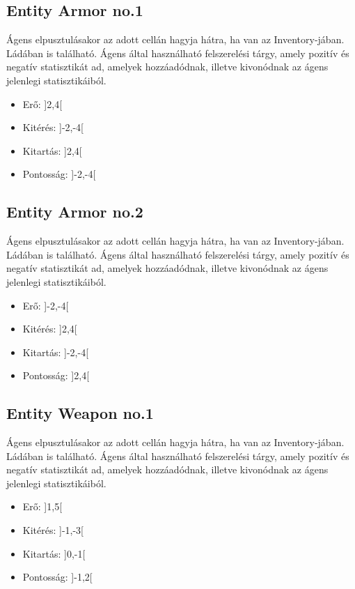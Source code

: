 \subsection{Entity Armor no.1}

Ágens elpusztulásakor az adott cellán hagyja hátra, ha van az Inventory-jában. Ládában is található.
Ágens által használható felszerelési tárgy, amely pozitív és negatív statisztikát ad, amelyek hozzáadódnak, illetve kivonódnak az ágens jelenlegi statisztikáiból.

\begin{itemize}
    \item Erő: ]2,4[
    \item Kitérés: ]-2,-4[
    \item Kitartás: ]2,4[
    \item Pontosság: ]-2,-4[
\end{itemize}

\subsection{Entity Armor no.2}

Ágens elpusztulásakor az adott cellán hagyja hátra, ha van az Inventory-jában. Ládában is található.
Ágens által használható felszerelési tárgy, amely pozitív és negatív statisztikát ad, amelyek hozzáadódnak, illetve kivonódnak az ágens jelenlegi statisztikáiból.

\begin{itemize}
    \item Erő: ]-2,-4[
    \item Kitérés: ]2,4[
    \item Kitartás: ]-2,-4[
    \item Pontosság: ]2,4[
\end{itemize}

\subsection{Entity Weapon no.1}

Ágens elpusztulásakor az adott cellán hagyja hátra, ha van az Inventory-jában. Ládában is található.
Ágens által használható felszerelési tárgy, amely pozitív és negatív statisztikát ad, amelyek hozzáadódnak, illetve kivonódnak az ágens jelenlegi statisztikáiból.

\begin{itemize}
    \item Erő: ]1,5[
    \item Kitérés: ]-1,-3[
    \item Kitartás: ]0,-1[
    \item Pontosság: ]-1,2[
\end{itemize}

